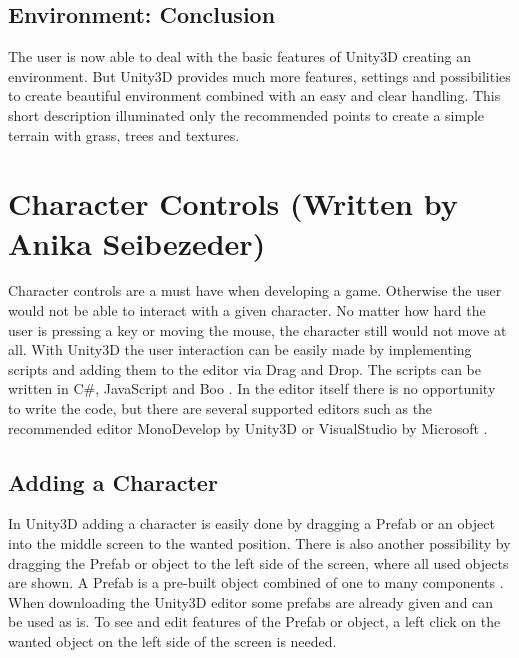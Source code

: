 \documentclass[conference]{IEEEtran}
\newcommand{\csh}{C{\#}}
\begin{document}
\subsection{Environment: Conclusion}
The user is now able to deal with the basic features of Unity3D creating an environment. But Unity3D provides much more features, settings and possibilities to create beautiful environment combined with an easy and clear handling. This short description illuminated only the recommended points to create a simple terrain with grass, trees and textures.


\section{Character Controls (Written by Anika Seibezeder)}

Character controls are a must have when developing a game. Otherwise the user would not be able to interact with a given character. No matter how hard the user is pressing a key or moving the mouse, the character still would not move at all.
With Unity3D the user interaction can be easily made by implementing scripts and adding them to the editor via Drag and Drop. The scripts can be written in \csh, JavaScript and Boo \cite{b1}. In the editor itself there is no opportunity to write the code, but there are several supported editors such as the recommended editor MonoDevelop by Unity3D or VisualStudio by Microsoft \cite{b1}.

\subsection{Adding a Character}

In Unity3D adding a character is easily done by dragging a Prefab or an object into the middle screen to the wanted position. There is also another possibility by dragging the Prefab or object to the left side of the screen, where all used objects are shown. A Prefab is a pre-built object combined of one to many components \cite{b2}. When downloading the Unity3D editor some prefabs are already given and can be used as is.
To see and edit features of the Prefab or object, a left click on the wanted object on the left side of the screen is needed. 
\end{document}
